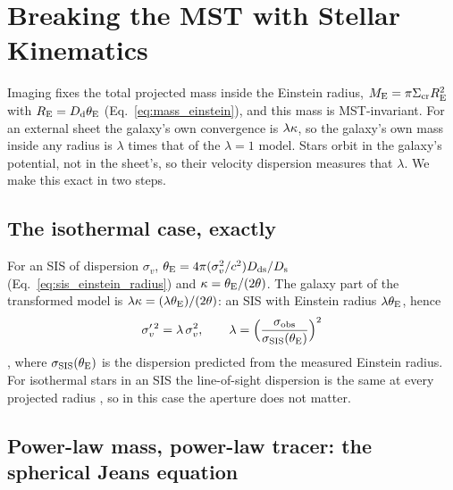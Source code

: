 \section{Breaking the MST with Stellar Kinematics}
\label{sec:ms_kinematics}

Imaging fixes the total projected mass inside the Einstein radius,
$M_{\rm E}=\pi\Sigma_{\mathrm{cr}} R_{\rm E}^2$ with $R_{\rm E}=D_{\mathrm{d}}\theta_{\mathrm{E}}$
(Eq.~\ref{eq:mass_einstein}), and this mass is MST-invariant.  For an external
sheet the galaxy's own convergence is $\lambda\kappa$, so the galaxy's own
mass inside any radius is $\lambda$ times that of the $\lambda=1$ model.  Stars
orbit in the galaxy's potential, not in the sheet's, so their velocity
dispersion measures that $\lambda$.  We make this exact in two steps.

\subsection{The isothermal case, exactly}
\label{sec:ms_sis_kin}

For an SIS of dispersion $\sigma_v$, $\theta_{\mathrm{E}}=4\pi(\sigma_v^2/c^2)D_{\mathrm{ds}}/D_{\mathrm{s}}$
(Eq.~\ref{eq:sis_einstein_radius}) and $\kappa=\theta_{\mathrm{E}}/(2\theta)$.  The
galaxy part of the transformed model is $\lambda\kappa=(\lambda\theta_{\mathrm{E}})/(2\theta)$:
an SIS with Einstein radius $\lambda\theta_{\mathrm{E}}$, hence
\begin{equation}
    \sigma_v'^{\,2}=\lambda\,\sigma_v^2 ,
    \qquad
    \lambda=\Bigl(\frac{\sigma_{\rm obs}}{\sigma_{\rm SIS}(\theta_{\mathrm{E}})}\Bigr)^2
    \label{eq:ms_sis_kin}
\end{equation}
, where $\sigma_{\rm SIS}(\theta_{\mathrm{E}})$ is the dispersion predicted from
the measured Einstein radius.  For isothermal stars in an SIS the
line-of-sight dispersion is the same at every projected radius , so
in this case the aperture does not matter.

\subsection{Power-law mass, power-law tracer: the spherical Jeans equation}
\label{sec:ms_jeans}

